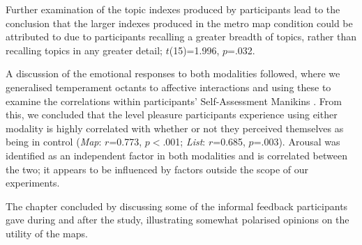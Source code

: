 Further examination of the topic indexes produced by participants lead to the conclusion that the larger indexes produced in the metro map condition could be attributed to due to participants recalling a greater breadth of topics, rather than recalling topics in any greater detail; $t$(15)=1.996, $p$=.032.

A discussion of the emotional responses to both modalities followed, where we generalised  temperament octants to affective interactions and using these to examine the correlations within participants' Self-Assessment Manikins \citep{measuringemotion}. From this, we concluded that the level pleasure participants experience using either modality is highly correlated with whether or not they perceived themselves as being in control (\textit{Map}: $r$=0.773, $p<$.001; \textit{List}: $r$=0.685, $p$=.003). Arousal was identified as an independent factor in both modalities and is correlated between the two; it appears to be influenced by factors outside the scope of our experiments.

The chapter concluded by discussing some of the informal feedback participants gave during and after the study, illustrating somewhat polarised opinions on the utility of the maps.